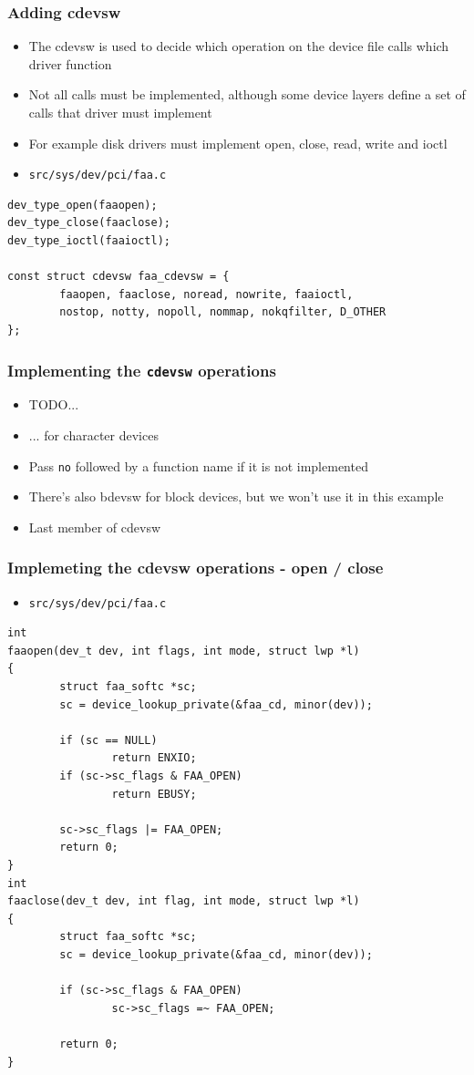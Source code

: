 \documentclass[dvipsnames,table]{beamer}
\begin{document}
\begin{frame}[fragile]
\frametitle{Adding cdevsw}
\begin{itemize}
	\item The cdevsw is used to decide which operation on the device file calls which driver function
	\item Not all calls must be implemented, although some device layers define a set of calls that driver must implement
	\item For example disk drivers must implement open, close, read, write and ioctl
\end{itemize}
\begin{itemize}
	\item {\tt src/sys/dev/pci/faa.c}
\end{itemize}
\begin{lstlisting}
dev_type_open(faaopen);
dev_type_close(faaclose);
dev_type_ioctl(faaioctl);

const struct cdevsw faa_cdevsw = {
        faaopen, faaclose, noread, nowrite, faaioctl,
        nostop, notty, nopoll, nommap, nokqfilter, D_OTHER
};
\end{lstlisting}
\end{frame}

\begin{frame}
\frametitle{Implementing the {\tt cdevsw} operations}
\begin{itemize}
	\item TODO...
	\item ... for character devices
	\item Pass {\tt no} followed by a function name if it is not implemented  
	\item There's also bdevsw for block devices, but we won't use it in this example
	\item Last member of cdevsw 
\end{itemize}
\end{frame}

\begin{frame}[fragile]
\frametitle{Implemeting the cdevsw operations - open / close}
\begin{itemize}
	\item {\tt src/sys/dev/pci/faa.c}
\end{itemize}
\begin{lstlisting}
int
faaopen(dev_t dev, int flags, int mode, struct lwp *l)
{
        struct faa_softc *sc;
        sc = device_lookup_private(&faa_cd, minor(dev));

        if (sc == NULL)
                return ENXIO;
        if (sc->sc_flags & FAA_OPEN)
                return EBUSY;

        sc->sc_flags |= FAA_OPEN;
        return 0;
}
int
faaclose(dev_t dev, int flag, int mode, struct lwp *l)
{
        struct faa_softc *sc;
        sc = device_lookup_private(&faa_cd, minor(dev));

        if (sc->sc_flags & FAA_OPEN)
                sc->sc_flags =~ FAA_OPEN;

        return 0;
}
\end{lstlisting}
\end{frame}
\end{document}
